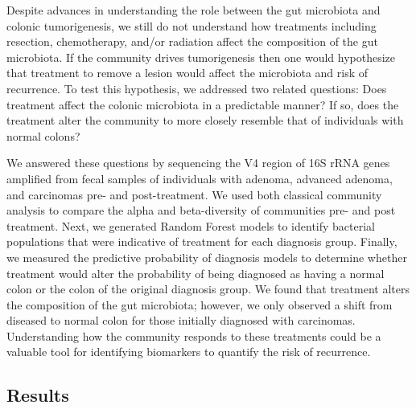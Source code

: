 \documentclass[12pt,]{article}
\begin{document}
Despite advances in understanding the role between the gut microbiota
and colonic tumorigenesis, we still do not understand how treatments
including resection, chemotherapy, and/or radiation affect the
composition of the gut microbiota. If the community drives tumorigenesis
then one would hypothesize that treatment to remove a lesion would
affect the microbiota and risk of recurrence. To test this hypothesis,
we addressed two related questions: Does treatment affect the colonic
microbiota in a predictable manner? If so, does the treatment alter the
community to more closely resemble that of individuals with normal
colons?

We answered these questions by sequencing the V4 region of 16S rRNA
genes amplified from fecal samples of individuals with adenoma, advanced
adenoma, and carcinomas pre- and post-treatment. We used both classical
community analysis to compare the alpha and beta-diversity of
communities pre- and post treatment. Next, we generated Random Forest
models to identify bacterial populations that were indicative of
treatment for each diagnosis group. Finally, we measured the predictive
probability of diagnosis models to determine whether treatment would
alter the probability of being diagnosed as having a normal colon or the
colon of the original diagnosis group. We found that treatment alters
the composition of the gut microbiota; however, we only observed a shift
from diseased to normal colon for those initially diagnosed with
carcinomas. Understanding how the community responds to these treatments
could be a valuable tool for identifying biomarkers to quantify the risk
of recurrence.

\newpage

\subsection{Results}\label{results}
\end{document}
